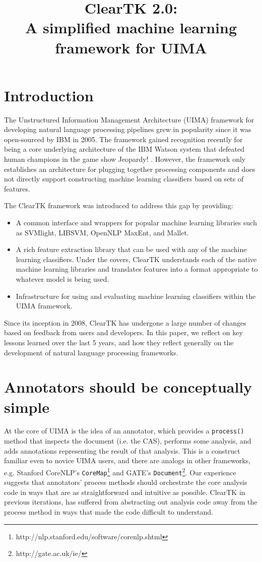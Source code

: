 \documentclass[10pt, a4paper]{article}
\title{ClearTK 2.0:\\ A simplified machine learning framework for UIMA}
\newcommand{\code}[1]{\texttt{\small #1}}
\begin{document}
\maketitleabstract

\section{Introduction}
The Unstructured Information Management Architecture (UIMA) framework for developing natural language processing pipelines grew in popularity since it was open-sourced by IBM in 2005.
The framework gained recognition recently for being a core underlying architecture of the IBM Watson system that defeated human champions in the game show Jeopardy! \cite{ferrucci_building_2010}.
However, the framework only establishes an architecture for plugging together processing components and does not directly support constructing machine learning classifiers based on sets of features.

The ClearTK framework was introduced to address this gap \cite{ogren-etal:2008:UIMA-LREC,ogren-etal:2009:UIMA-GSCL} by providing:
\begin{itemize}
\item A common interface and wrappers for popular machine learning libraries such as SVMlight, LIBSVM, OpenNLP MaxEnt, and Mallet.
\item A rich feature extraction library that can be used with any of the machine learning classifiers. Under the covers, ClearTK understands each of the native machine learning libraries and translates features into a format appropriate to whatever model is being used.
\item Infrastructure for using and evaluating machine learning classifiers within the UIMA framework.
\end{itemize}

Since its inception in 2008, ClearTK has undergone a large number of changes based on feedback from users and developers.
In this paper, we reflect on key lessons learned over the last 5 years, and how they reflect generally on the development of natural language processing frameworks.

\section{Annotators should be conceptually simple}
\label{sec:annotators}
At the core of UIMA is the idea of an annotator, which provides a \code{process()} method that inspects the document (i.e. the CAS), performs some analysis, and adds annotations representing the result of that analysis.  This is a construct familiar even to novice UIMA users, and there are analogs in other frameworks, e.g. Stanford CoreNLP's \code{CoreMap}\footnote{http://nlp.stanford.edu/software/corenlp.shtml} and GATE's \code{Document}\footnote{http://gate.ac.uk/ie/}.  Our experience suggests that annotators' process methods should orchestrate the core analysis code in ways that are as straightforward and intuitive as possible.  ClearTK in previous iterations, has suffered from abstracting out analysis code away from the process method in ways that made the code difficult to understand.  
\end{document}
